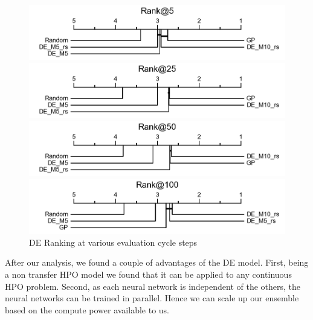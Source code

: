 \documentclass[12pt, twoside, ngerman]{report}
\begin{document}
\begin{figure}[h]%
\centering
\begin{minipage}{0.45\textwidth}
\includegraphics[width=\textwidth]{images/DERank5}
\end{minipage}\hfill
\begin{minipage}{0.45\textwidth}
\includegraphics[width=\textwidth]{images/DERank25}
\end{minipage}\par
\begin{minipage}{0.45\textwidth}
\includegraphics[width=\textwidth]{images/DERank50}
\end{minipage}\hfill
\begin{minipage}{0.45\textwidth}
\includegraphics[width=\textwidth]{images/DERank100}
\end{minipage}
    \caption{DE Ranking at various evaluation cycle steps}
   \label{fig:DERank100}
\end{figure}

After our analysis,  we found a couple of advantages of the DE model.
First,  being a non transfer HPO model we found that it can be applied to any continuous HPO problem.
Second,  as each neural network is independent of the others,  the neural networks can be trained in parallel.
Hence we can scale up our ensemble based on the compute power available to us.
\end{document}
